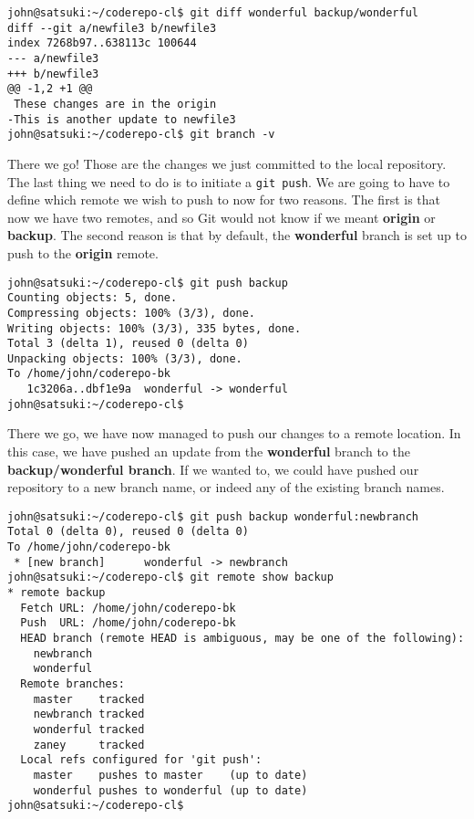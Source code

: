 \begin{Verbatim}[frame=leftline,framerule=1mm,fontsize=\relsize{-3}] 
john@satsuki:~/coderepo-cl$ git diff wonderful backup/wonderful 
diff --git a/newfile3 b/newfile3
index 7268b97..638113c 100644
--- a/newfile3
+++ b/newfile3
@@ -1,2 +1 @@
 These changes are in the origin
-This is another update to newfile3
john@satsuki:~/coderepo-cl$ git branch -v
\end{Verbatim}

There we go!  Those are the changes we just committed to the local repository.  The last thing we need to do is to initiate a \texttt{git push}.  We are going to have to define which remote we wish to push to now for two reasons.  The first is that now we have two remotes, and so Git would not know if we meant \textbf{origin} or \textbf{backup}.  The second reason is that by default, the \textbf{wonderful} branch is set up to push to the \textbf{origin} remote.

\begin{Verbatim}[frame=leftline,framerule=1mm,fontsize=\relsize{-3}] 
john@satsuki:~/coderepo-cl$ git push backup
Counting objects: 5, done.
Compressing objects: 100% (3/3), done.
Writing objects: 100% (3/3), 335 bytes, done.
Total 3 (delta 1), reused 0 (delta 0)
Unpacking objects: 100% (3/3), done.
To /home/john/coderepo-bk
   1c3206a..dbf1e9a  wonderful -> wonderful
john@satsuki:~/coderepo-cl$ 
\end{Verbatim}

There we go, we have now managed to push our changes to a remote location.  In this case, we have pushed an update from the \textbf{wonderful} branch to the \textbf{backup/wonderful branch}.  If we wanted to, we could have pushed our repository to a new branch name, or indeed any of the existing branch names.

\begin{Verbatim}[frame=leftline,framerule=1mm,fontsize=\relsize{-3}] 
john@satsuki:~/coderepo-cl$ git push backup wonderful:newbranch
Total 0 (delta 0), reused 0 (delta 0)
To /home/john/coderepo-bk
 * [new branch]      wonderful -> newbranch
john@satsuki:~/coderepo-cl$ git remote show backup
* remote backup
  Fetch URL: /home/john/coderepo-bk
  Push  URL: /home/john/coderepo-bk
  HEAD branch (remote HEAD is ambiguous, may be one of the following):
    newbranch
    wonderful
  Remote branches:
    master    tracked
    newbranch tracked
    wonderful tracked
    zaney     tracked
  Local refs configured for 'git push':
    master    pushes to master    (up to date)
    wonderful pushes to wonderful (up to date)
john@satsuki:~/coderepo-cl$ 
\end{Verbatim}

